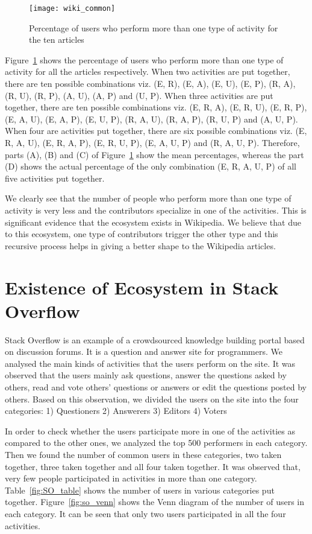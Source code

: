\documentclass{llncs}
\begin{document}
\begin{figure}[htbp]
\centering
\texttt{[image: wiki\_common]}
\caption{Percentage of users who perform more than one type of activity for the ten articles}
\label{fig:wiki_common}
\end{figure}
Figure~\ref{fig:wiki_common} shows the percentage of users who perform more than one type of activity for all the articles respectively.  When two activities are put together, there are ten possible combinations viz. (E, R), (E, A), (E, U), (E, P), (R, A), (R, U), (R, P), (A, U), (A, P) and (U, P). When three activities are put together, there are ten possible combinations viz. (E, R, A), (E, R, U), (E, R, P), (E, A, U), (E, A, P), (E, U, P), (R, A, U), (R, A, P), (R, U, P) and (A, U, P). When four are activities put together, there are six possible combinations viz. (E, R, A, U), (E, R, A, P), (E, R, U, P), (E, A, U, P) and (R, A, U, P). Therefore, parts (A), (B) and (C) of Figure~\ref{fig:wiki_common} show the mean percentages, whereas the part (D) shows the actual percentage of the only combination (E, R, A, U, P) of all five activities put together.

We clearly see that the number of people who perform more than one type of activity is very less and the contributors specialize in one of the activities. This is significant evidence that the ecosystem exists in Wikipedia. We believe that due to this ecosystem, one type of contributors trigger the other type and this recursive process helps in giving a better shape to the Wikipedia articles. 

\section{Existence of Ecosystem in Stack Overflow}
Stack Overflow is an example of a crowdsourced knowledge building portal based on discussion forums. It is a question and answer site for programmers. We analysed the main kinds of activities that the users perform on the site. It was observed that the users mainly ask questions, answer the questions asked by others, read and vote others’ questions or answers or edit the questions posted by others. Based on this observation, we divided the users on the site into the four categories: 1) Questioners 2) Answerers 3) Editors 4) Voters

In order to check whether the users participate more in one of the activities as compared to the other ones, we analyzed the top 500 performers in each category. Then we found the number of common users in these categories, two taken together, three taken together and all four taken together. It was observed that, very few people participated in activities in more than one category. Table~\ref{fig:SO_table} shows the number of users in various categories put together. Figure~\ref{fig:so_venn} shows the Venn diagram of the number of users in each category. It can be seen that only two users participated in all the four activities.  
\end{document}
